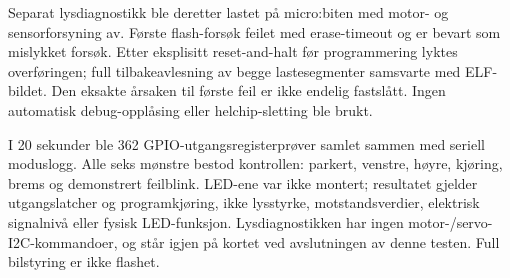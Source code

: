Separat lysdiagnostikk ble deretter lastet på micro:biten med motor- og
sensorforsyning av. Første flash-forsøk feilet med erase-timeout og er
bevart som mislykket forsøk. Etter eksplisitt reset-and-halt før
programmering lyktes overføringen; full tilbakeavlesning av begge
lastesegmenter samsvarte med ELF-bildet. Den eksakte årsaken til første
feil er ikke endelig fastslått. Ingen automatisk debug-opplåsing eller
helchip-sletting ble brukt.

I 20 sekunder ble 362 GPIO-utgangsregisterprøver samlet sammen med
seriell moduslogg. Alle seks mønstre bestod kontrollen: parkert, venstre,
høyre, kjøring, brems og demonstrert feilblink. LED-ene var ikke montert;
resultatet gjelder utgangslatcher og programkjøring, ikke lysstyrke,
motstandsverdier, elektrisk signalnivå eller fysisk LED-funksjon.
Lysdiagnostikken har ingen motor-/servo-I2C-kommandoer, og står igjen på
kortet ved avslutningen av denne testen. Full bilstyring er ikke flashet.
